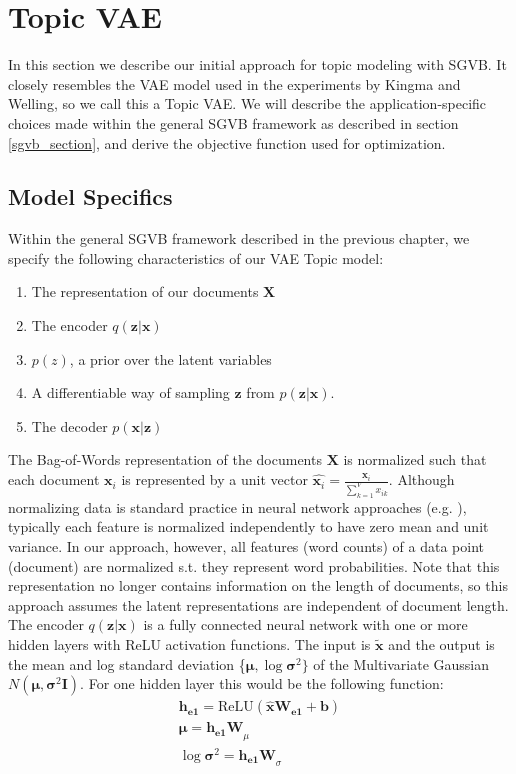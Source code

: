 \documentclass{report}
\begin{document}
\section{Topic VAE}\label{TopicVAE}

In this section we describe our initial approach for topic modeling with SGVB. It closely resembles the VAE model used in the experiments by Kingma and Welling\cite{kingma2013auto}, so we call this a Topic VAE. We will describe the application-specific choices made within the general SGVB framework as described in section \ref{sgvb_section}, and derive the objective function used for optimization. 

\subsection{Model Specifics}

Within the general SGVB framework described in the previous chapter, we specify the following characteristics of our VAE Topic model:

\begin{enumerate}
	\item The representation of our documents $\mathbf{X}$
	\item The encoder $q(\mathbf{z}|\mathbf{x})$
	\item $p(z)$, a prior  over the latent variables
	\item A differentiable way of sampling $\mathbf{z}$ from $p(\mathbf{z}|\mathbf{x})$. 
	\item The decoder $p(\mathbf{x}|\mathbf{z})$
\end{enumerate}

The Bag-of-Words representation of the documents ${\mathbf{X}}$ is normalized such that each document $\mathbf{x}_i$ is represented by a unit vector $\hat{\mathbf{x}_i} = \frac{\mathbf{x}_i}{\sum_{k=1}^{V}x_{ik}}$. Although normalizing data is standard practice in neural network approaches (e.g. \cite{bishop1995neural}), typically each feature is normalized independently to have zero mean and unit variance. In our approach, however, all features (word counts) of a data point (document) are normalized s.t. they represent word probabilities.  Note that this representation no longer contains information on the length of documents, so this approach assumes the latent representations are independent of document length.
\\
The encoder $q(\mathbf{z}|\mathbf{x})$ is a fully connected neural network with one or more hidden layers with ReLU activation functions. The input is $\tilde{\mathbf{x}}$ and the output is the mean and log standard deviation \{$\boldsymbol{\mu}, \log \boldsymbol{\sigma} ^2\}$ of the Multivariate Gaussian $N(\boldsymbol{\mu}, \boldsymbol{\sigma} ^2\textbf{I})$. For one hidden layer this would be the following function:
\begin{align}
\mathbf{h_{e1}} = \text{ReLU}(\mathbf{\hat{x}}\mathbf{W_{e1}} + \mathbf{b}) \label{he1}\\
\boldsymbol{\mu} = \mathbf{h_{e1}W}_{\mu} \label{vae_encoding_mu} \\
\log \boldsymbol{\sigma}^2 = \mathbf{h_{e1}W}_{\sigma} \label{vae_encoding_sig}
\end{align} 
\end{document}
